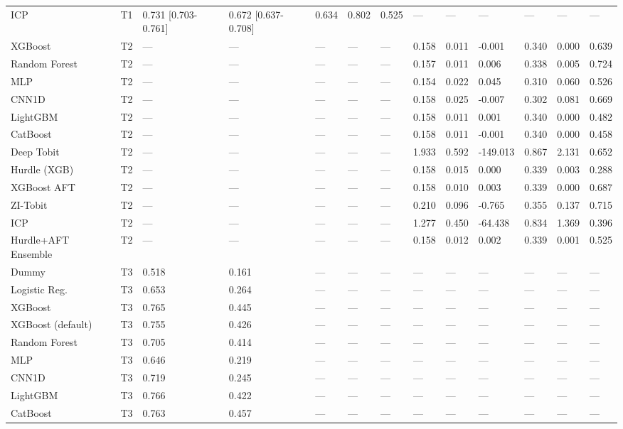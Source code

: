 \begin{table}
\begin{tabular}{lllllllllllll}
ICP & T1 & 0.731 [0.703-0.761] & 0.672 [0.637-0.708] & 0.634 & 0.802 & 0.525 & — & — & — & — & — & — \\
XGBoost & T2 & — & — & — & — & — & 0.158 & 0.011 & -0.001 & 0.340 & 0.000 & 0.639 \\
Random Forest & T2 & — & — & — & — & — & 0.157 & 0.011 & 0.006 & 0.338 & 0.005 & 0.724 \\
MLP & T2 & — & — & — & — & — & 0.154 & 0.022 & 0.045 & 0.310 & 0.060 & 0.526 \\
CNN1D & T2 & — & — & — & — & — & 0.158 & 0.025 & -0.007 & 0.302 & 0.081 & 0.669 \\
LightGBM & T2 & — & — & — & — & — & 0.158 & 0.011 & 0.001 & 0.340 & 0.000 & 0.482 \\
CatBoost & T2 & — & — & — & — & — & 0.158 & 0.011 & -0.001 & 0.340 & 0.000 & 0.458 \\
Deep Tobit & T2 & — & — & — & — & — & 1.933 & 0.592 & -149.013 & 0.867 & 2.131 & 0.652 \\
Hurdle (XGB) & T2 & — & — & — & — & — & 0.158 & 0.015 & 0.000 & 0.339 & 0.003 & 0.288 \\
XGBoost AFT & T2 & — & — & — & — & — & 0.158 & 0.010 & 0.003 & 0.339 & 0.000 & 0.687 \\
ZI-Tobit & T2 & — & — & — & — & — & 0.210 & 0.096 & -0.765 & 0.355 & 0.137 & 0.715 \\
ICP & T2 & — & — & — & — & — & 1.277 & 0.450 & -64.438 & 0.834 & 1.369 & 0.396 \\
Hurdle+AFT Ensemble & T2 & — & — & — & — & — & 0.158 & 0.012 & 0.002 & 0.339 & 0.001 & 0.525 \\
Dummy & T3 & 0.518 & 0.161 & — & — & — & — & — & — & — & — & — \\
Logistic Reg. & T3 & 0.653 & 0.264 & — & — & — & — & — & — & — & — & — \\
XGBoost & T3 & 0.765 & 0.445 & — & — & — & — & — & — & — & — & — \\
XGBoost (default) & T3 & 0.755 & 0.426 & — & — & — & — & — & — & — & — & — \\
Random Forest & T3 & 0.705 & 0.414 & — & — & — & — & — & — & — & — & — \\
MLP & T3 & 0.646 & 0.219 & — & — & — & — & — & — & — & — & — \\
CNN1D & T3 & 0.719 & 0.245 & — & — & — & — & — & — & — & — & — \\
LightGBM & T3 & 0.766 & 0.422 & — & — & — & — & — & — & — & — & — \\
CatBoost & T3 & 0.763 & 0.457 & — & — & — & — & — & — & — & — & — \\

\end{tabular}
\end{table}
